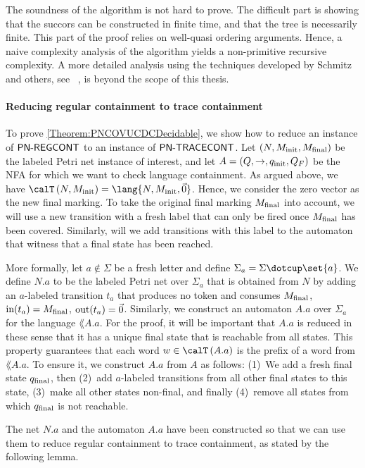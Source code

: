\documentclass[../../diss.tex]{subfiles}
\begin{document}
The soundness of the algorithm is not hard to prove.
The difficult part is showing that the succors can be constructed in finite time, and that the tree is necessarily finite.
This part of the proof relies on well-quasi ordering arguments.
Hence, a naive complexity analysis of the algorithm yields a non-primitive recursive complexity.
A more detailed analysis using the techniques developed by Schmitz and others, see \eg~\cite{LazicS15}, is beyond the scope of this thesis.

\paragraph{Reducing regular containment to trace containment}

To prove \cref{Theorem:PNCOVUCDCDecidable}, we show how to reduce an instance of $\mathsf{PN\text{-}REGCONT}$ to an instance of $\mathsf{PN\text{-}TRACECONT}$.
Let $(N,M_{\text{init}},M_{\text{final}})$ be the labeled Petri net instance of interest, and let $A = (Q,\to,q_{\text{init}},Q_F)$ be the NFA for which we want to check language containment.
As argued above, we have $\Traces{N,\Minit} = \lang{N,\Minit,\vec{0}}$.
Hence, we consider the zero vector as the new final marking.
To take the original final marking $M_{\text{final}}$ into account, we will use a new transition with a fresh label that can only be fired once $M_{\text{final}}$ has been covered.
Similarly, will we add transitions with this label to the automaton that witness that a final state has been reached.

More formally, let $a \not\in \Sigma$ be a fresh letter and define $\Sigma_a = \Sigma \dotcup \set{a}$.
We define $N.a$ to be the labeled Petri net over $\Sigma_a$ that is obtained from $N$ by adding an $a$-labeled transition $t_a$ that produces no token and consumes $M_{\text{final}}$, \ie $\text{in}(t_a) = M_{\text{final}}$, $\text{out}(t_a) = \vec{0}$.
Similarly, we construct an automaton $A.a$ over $\Sigma_a$ for the language $\lang{A}.a$.
For the proof, it will be important that $A.a$ is reduced in these sense that it has a unique final state that is reachable from all states.
This property guarantees that each word $w \in \Traces{A.a}$ is the prefix of a word from $\lang{A.a}$.
To ensure it, we construct $A.a$ from $A$ as follows:
(1)~We add a fresh final state $q_{\text{final}}$, then (2)~add $a$-labeled transitions from all other final states to this state, (3)~make all other states non-final, and finally (4)~remove all states from which $q_{\text{final}}$ is not reachable.

The net $N.a$ and the automaton $A.a$ have been constructed so that we can use them to reduce regular containment to trace containment, as stated by the following lemma.
\end{document}
